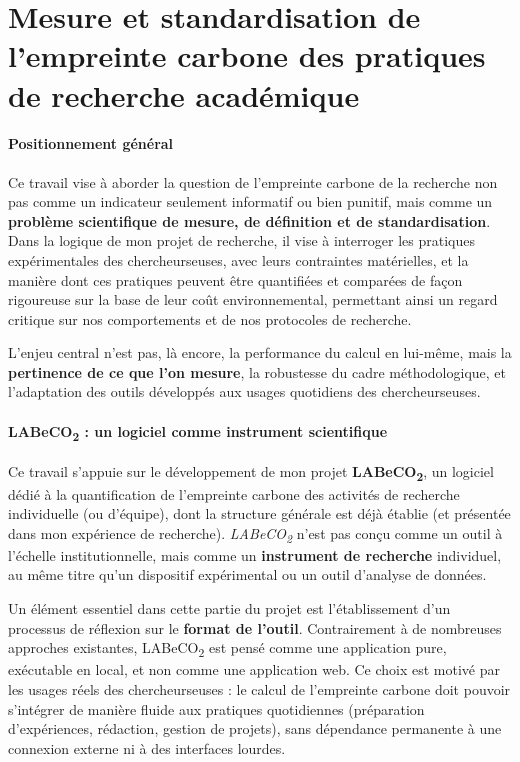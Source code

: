 \documentclass[11pt,a4paper]{article}
\begin{document}
\section{Mesure et standardisation de l’empreinte carbone des pratiques de recherche académique}

\paragraph{Positionnement général}

Ce travail vise à aborder la question de l’empreinte carbone de la recherche non pas comme un indicateur seulement informatif ou bien punitif,
mais comme un \textbf{problème scientifique de mesure, de définition et de standardisation}.
Dans la logique de mon projet de recherche, il vise à interroger les pratiques expérimentales des chercheurs\textperiodcentered euses, avec leurs contraintes matérielles, et la manière dont ces pratiques peuvent être quantifiées et
comparées de façon rigoureuse sur la base de leur coût environnemental, permettant ainsi un regard critique sur nos comportements et de nos protocoles de recherche.

L’enjeu central n’est pas, là encore, la performance du calcul en lui-même, mais la \textbf{pertinence de ce que l'on mesure}, la robustesse du cadre méthodologique, et l'adaptation des outils développés
aux usages quotidiens des chercheurs\textperiodcentered euses.

\paragraph{LABeCO\textsubscript{2} : un logiciel comme instrument scientifique}

Ce travail s’appuie sur le développement de mon projet \textbf{LABeCO\textsubscript{2}}, un logiciel dédié à la quantification de l’empreinte carbone des activités de recherche individuelle (ou d'équipe),
dont la structure générale est déjà établie (et présentée dans mon expérience de recherche).
\textit{LABeCO\textsubscript{2}} n’est pas conçu comme un outil à l'échelle institutionnelle, mais comme un \textbf{instrument de recherche} individuel,
au même titre qu’un dispositif expérimental ou un outil d’analyse de données.

Un élément essentiel dans cette partie du projet est l'établissement d'un processus de réflexion sur le \textbf{format de l’outil}.
Contrairement à de nombreuses approches existantes, LABeCO\textsubscript{2} est pensé comme une application pure, exécutable en local, et non comme une application web.
Ce choix est motivé par les usages réels des chercheurs\textperiodcentered euses :
le calcul de l’empreinte carbone doit pouvoir s’intégrer de manière fluide aux pratiques quotidiennes (préparation d’expériences, rédaction, gestion de projets),
sans dépendance permanente à une connexion externe ni à des interfaces lourdes.
\end{document}
